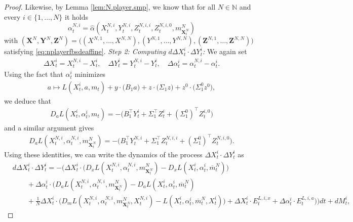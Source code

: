 \documentclass[11pt,reqno]{amsart}
\numberwithin{equation}{section}
\theoremstyle{definition}
\def\N{{\mathbb N}}
\newcommand{\bX}{\mathbf{X}}
\newcommand{\bY}{\mathbf{Y}}
\newcommand{\bZ}{\mathbf{Z}}
\newcommand{\ov}{\overline}
\def \N{\mathbb{N}}
\begin{document}
\begin{proof}
Likewise, by Lemma \ref{lem:N.player.smp}, we know that for all $N\in \N$ and every $i \in \{1, \dots, N\}$ it holds
\begin{equation*}
  \alpha_t^{N,i} = \widehat{\alpha}(X_t^{N,i},Y_t^{N,i},Z_t^{N,i,i},Z_t^{N,i,0}, m_{\bX_t^N}^N)
\end{equation*}
with $(\bX^N, \bY^N, \bZ^N) = \big( (X^{N,1},\dots,X^{N,N}), (Y^{N,1},\dots,Y^{N,N}), (\bZ^{N,1},\dots,\bZ^{N,N})\big)$
satisfying \eqref{eq:nplayerfbsdeaffine}. 
\newline \newline  \noindent 
\textit{Step 2: Computing $d \Delta X_t^i \cdot \Delta Y_t^i$:} We again set
\begin{align*}
\Delta X_t^i = X_t^{N,i} - X_t^i, \quad \Delta Y_t^i = Y_t^{N,i} - Y_t^i, \quad \Delta \alpha_t^i = \alpha_t^{N,i} - \alpha_t^i. 
\end{align*}
Using the fact that $\alpha_t^i$ minimizes 
\begin{align*}
a \mapsto L(X_t^i, a, m_t) + y \cdot \big(B_1 a\big) + z \cdot \big( \Sigma_1 z \big) + z^0 \cdot \big(\Sigma_1^0 z^0 \big),  
\end{align*}
we deduce that 
\begin{align*}
D_a L(X_t^i, \alpha_t^i, m_t) = - \Big(B_1^\top Y_t^i + \Sigma_1^\top Z_t^i + (\Sigma_1^0)^\top Z_t^{i,0} \Big)
\end{align*}
and a similar argument gives 
\begin{align*}
D_a L(X_t^{N,i}, \alpha_t^{N,i}, m_{\bX_t^N}^N) = - \Big(B_1^\top Y_t^{N,i} + \Sigma_1^\top Z_t^{N,i,i} + (\Sigma_1^0)^\top Z_t^{N,i,0} \Big).
\end{align*}
Using these identities, we can write the dynamics of the process $\Delta X_t^i \cdot \Delta Y_t^i$ as
\begin{align} \label{firstxycompaffine}
  &d \Delta X_t^i \cdot \Delta Y_t^i = - \Big( \Delta X_t^i \cdot \big(D_x L(X_t^{N,i}, \alpha_t^{N,i}, m_{\bX_t^N}^N) - D_x L(X_t^{i}, \alpha_t^{i}, \ov{m}_t^N)\big) \nonumber  \\ 
  \nonumber &\qquad+ \Delta \alpha_t^i \cdot \big(D_a L(X_t^{N,i}, \alpha_t^{N,i}, m_{\bX_t^N}^N) - D_a L(X_t^{i}, \alpha_t^{i}, \ov{m}_t^N) \\
  &\qquad + \frac{1}{N} \Delta X_t^i \cdot \big(D_m L(X_t^{N,i}, \alpha_t^{N,i}, m_{\bX_t^N}^N, X_t^{N,i}) - L(X_t^{i}, \alpha_t^{i}, \ov{m}_t^N,X_t^i) \big)
  + \Delta X_t^i \cdot E_t^{L,i,x} + \Delta \alpha_t^i \cdot E_t^{L,i,a} \big) \Big)  dt + dM_t^i, 
\end{align}

\end{proof}
\end{document}
